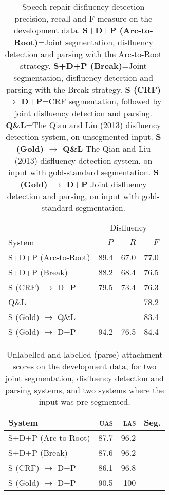 \documentclass[11pt,letterpaper]{article}
\begin{document}
\begin{table}
    \centering
    \small
    \begin{tabular}{l|rrr}
               & \multicolumn{3}{c}{Disfluency} \\
        System & $P$ & $R$ & $F$ \\
        \hline \hline
        S+D+P (Arc-to-Root) & 89.4 & 67.0 & 77.0 \\
        S+D+P (Break) & 88.2 & 68.4 & 76.5 \\
        S (CRF) $\rightarrow$ D+P & 79.5 & 73.4 & 76.3 \\
        \hline
        Q\&L  & & & 78.2 \\
        \hline
        S (Gold) $\rightarrow$ Q\&L & & & 83.4 \\
        S (Gold) $\rightarrow$ D+P & 94.2 & 76.5 & 84.4 \\
        \hline
    \end{tabular}
    \caption{\small Speech-repair disfluency detection precision, recall and
        F-measure on the development data.
        \textbf{S+D+P (Arc-to-Root)}=Joint segmentation, disfluency detection
        and parsing with the Arc-to-Root strategy.
        \textbf{S+D+P (Break)}=Joint
        segmentation, disfluency detection and parsing with the Break strategy.
        \textbf{S (CRF) $\rightarrow$ D+P}=CRF segmentation, followed by joint
        disfluency detection and parsing.
        \textbf{Q\&L}=The Qian and Liu (2013)
        disfluency detection system, on unsegmented input.
        \textbf{S (Gold) $\rightarrow$ Q\&L} The Qian and Liu (2013) disfluency
        detection system, on input with gold-standard segmentation.
        \textbf{S (Gold) $\rightarrow$ D+P} Joint disfluency detection and parsing,
             on input with gold-standard segmentation. \label{tab:dfl}}
\end{table}
\begin{table}
    \centering
    \small
    \begin{tabular}{l|rrr}
        System & \textsc{uas} & \textsc{las} & Seg. \\
        \hline \hline
        S+D+P (Arc-to-Root) & 87.7 & 96.2 \\
        S+D+P (Break) & 87.6 & 96.2 \\
        \hline
        S (CRF) $\rightarrow$ D+P & 86.1 & 96.8 \\
        S (Gold) $\rightarrow$ D+P & 90.5 & 100 \\
        \hline
    \end{tabular}
    \caption{\small Unlabelled and labelled (parse) attachment scores on the
        development data, for two joint segmentation, disfluency detection
        and parsing systems,
        and two systems where the input was pre-segmented.
        \label{tab:parse}}
\end{table}
\end{document}
